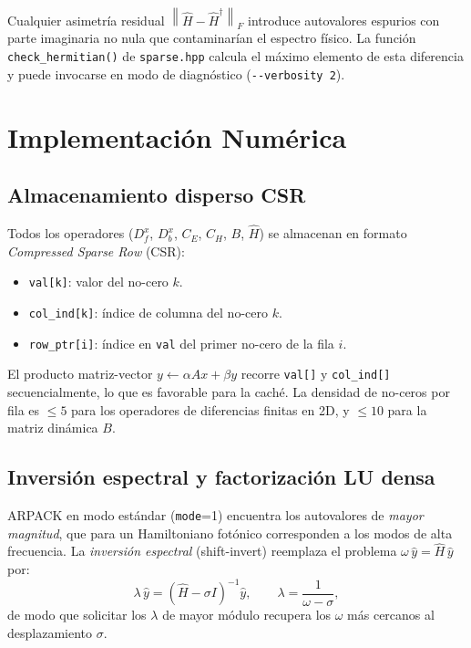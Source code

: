 \documentclass[12pt,a4paper]{article}
\newcommand{\Hhat}{\hat{H}}
\newcommand{\norm}[1]{\left\|#1\right\|}
\begin{document}
Cualquier asimetría residual $\norm{\Hhat - \Hhat^\dagger}_F$ introduce
autovalores espurios con parte imaginaria no nula que contaminarían el
espectro físico.
La función \texttt{check\_hermitian()} de \texttt{sparse.hpp} calcula el
máximo elemento de esta diferencia y puede invocarse en modo de diagnóstico
(\texttt{-{}-verbosity 2}).

\section{Implementación Numérica}

\subsection{Almacenamiento disperso CSR}

Todos los operadores ($D_f^x$, $D_b^x$, $C_E$, $C_H$, $B$, $\Hhat$) se
almacenan en formato \emph{Compressed Sparse Row} (CSR):
\begin{itemize}
  \item \texttt{val[k]}: valor del no-cero $k$.
  \item \texttt{col\_ind[k]}: índice de columna del no-cero $k$.
  \item \texttt{row\_ptr[i]}: índice en \texttt{val} del primer no-cero de la fila $i$.
\end{itemize}
El producto matriz-vector $y \leftarrow \alpha A x + \beta y$ recorre
\texttt{val[]} y \texttt{col\_ind[]} secuencialmente, lo que es
favorable para la caché.
La densidad de no-ceros por fila es $\leq 5$ para los operadores de
diferencias finitas en 2D, y $\leq 10$ para la matriz dinámica $B$.

\subsection{Inversión espectral y factorización LU densa}
\label{sec:shift_invert}

ARPACK en modo estándar (\texttt{mode}=1) encuentra los autovalores de
\emph{mayor magnitud}, que para un Hamiltoniano fotónico corresponden a
los modos de alta frecuencia.
La \emph{inversión espectral} (shift-invert) reemplaza el problema
$\omega\,\hat{y} = \Hhat\,\hat{y}$ por:
\begin{equation}
  \lambda\,\hat{y} = (\Hhat - \sigma I)^{-1}\hat{y},
  \qquad
  \lambda = \frac{1}{\omega - \sigma},
  \label{eq:shift_invert}
\end{equation}
de modo que solicitar los $\lambda$ de mayor módulo recupera los $\omega$
más cercanos al desplazamiento $\sigma$.
\end{document}
